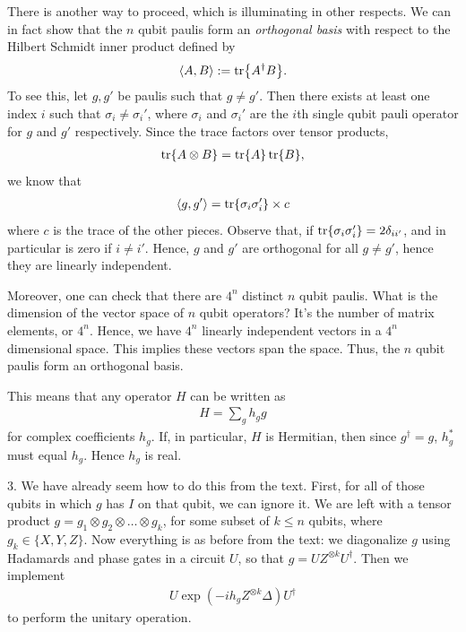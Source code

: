 \documentclass{book}
\begin{document}
    There is another way to proceed, which is illuminating in other respects. We can in fact show that the $n$ qubit paulis form an \emph{orthogonal basis} with respect to the Hilbert Schmidt inner product defined by
    \begin{align}
        \langle A, B \rangle := \tr{A^\dagger B}.
    \end{align}
    To see this, let $g, g'$ be paulis such that $g\neq g'.$ Then there exists at least one index $i$ such that $\sigma_i \neq \sigma_i'$, where $\sigma_i$ and $\sigma_i'$ are the $i$th single qubit pauli operator for $g$ and $g'$ respectively. Since the trace factors over tensor products,
    \begin{align}
        \tr{A\otimes B} = \tr{A}\tr{B},
    \end{align}
    we know that
    \begin{align}
        \langle g, g' \rangle = \tr{\sigma_i \sigma_i'} \times c
    \end{align}
    where $c$ is the trace of the other pieces. Observe that, if $\tr{\sigma_i \sigma_i'} = 2 \delta_{i i'}$, and in particular is zero if $i \neq i'.$ Hence, $g$ and $g'$ are orthogonal for all $g \neq g'$, hence they are linearly independent. 
    
    Moreover, one can check that there are $4^n$ distinct $n$ qubit paulis. What is the dimension of the vector space of $n$ qubit operators? It's the number of matrix elements, or $4^n$. Hence, we have $4^n$ linearly independent vectors in a $4^n$ dimensional space. This implies these vectors span the space. Thus, the $n$ qubit paulis form an orthogonal basis. 
    
    This means that any operator $H$ can be written as 
    \begin{align}
        H = \sum_g h_g g
    \end{align}
    for complex coefficients $h_g$. If, in particular, $H$ is Hermitian, then since $g^\dagger = g$, $h_g^*$ must equal $h_g$. Hence $h_g$ is real.

    3. We have already seem how to do this from the text. First, for all of those qubits in which $g$ has $I$ on that qubit, we can ignore it. We are left with a tensor product $g = g_1 \otimes g_2 \otimes \dots \otimes g_k$, for some subset of $k\leq n$ qubits, where $g_k \in \{X,Y,Z\}$. Now everything is as before from the text: we diagonalize $g$ using Hadamards and phase gates in a circuit $U$, so that $g = U Z^{\otimes k} U^\dagger$. Then we implement
    \begin{align}
        U \exp\left(-i h_g Z^{\otimes k} \Delta\right)U^\dagger
    \end{align}
    to perform the unitary operation.
\end{document}
